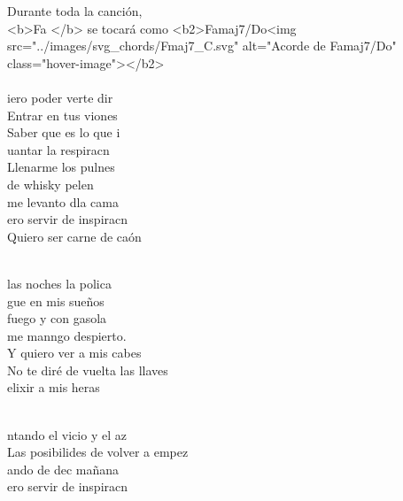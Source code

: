 \begin{cancion}[El Conticinio][Guitarricadelafuente]%
Durante toda la canción, \\
<b>Fa </b> se tocará como <b2>Famaj7/Do<img src="../images/svg_chords/Fmaj7_C.svg" alt="Acorde de Famaj7/Do" class="hover-image"></b2>\\
\jump
	    \chord{(}{***)}{     }\\
	iero poder verte dir\\
	Entrar en tus viones\\
	Saber que es lo que i\\
\jump
	uantar la respiracn\\
	Llenarme los pulnes\\
	de whisky pelen\\
\jump
	me levanto dla cama   \\
	ero servir de inspiracn \\
	Quiero ser carne de caón\\\jump\\
	\begin{chorus}%
	 las noches la polica \\
	gue en mis sueños\\
	 fuego y con gasola \\
	me manngo despierto.\\
\jump
	Y quiero ver a mis cabes\\
	No te diré de vuelta las llaves\\
	elixir a mis heras   \\
	\end{chorus}%
	\jump\\
	ntando el vicio y el az\\
	Las posibilides de volver a empez\\
	ando de dec mañana  \\
\jump
	ero servir de inspiracn \\

\end{cancion}
